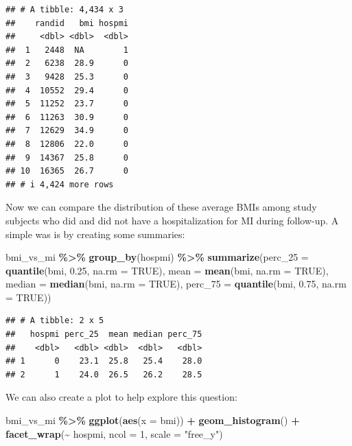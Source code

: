 \documentclass[
]{book}
\newenvironment{Shaded}{\begin{snugshade}}{\end{snugshade}}
\newcommand{\AttributeTok}[1]{\textcolor[rgb]{0.13,0.29,0.53}{#1}}
\newcommand{\ConstantTok}[1]{\textcolor[rgb]{0.56,0.35,0.01}{#1}}
\newcommand{\DecValTok}[1]{\textcolor[rgb]{0.00,0.00,0.81}{#1}}
\newcommand{\FloatTok}[1]{\textcolor[rgb]{0.00,0.00,0.81}{#1}}
\newcommand{\FunctionTok}[1]{\textcolor[rgb]{0.13,0.29,0.53}{\textbf{#1}}}
\newcommand{\NormalTok}[1]{#1}
\newcommand{\SpecialCharTok}[1]{\textcolor[rgb]{0.81,0.36,0.00}{\textbf{#1}}}
\newcommand{\StringTok}[1]{\textcolor[rgb]{0.31,0.60,0.02}{#1}}
\begin{document}
\begin{verbatim}
## # A tibble: 4,434 x 3
##    randid   bmi hospmi
##     <dbl> <dbl>  <dbl>
##  1   2448  NA        1
##  2   6238  28.9      0
##  3   9428  25.3      0
##  4  10552  29.4      0
##  5  11252  23.7      0
##  6  11263  30.9      0
##  7  12629  34.9      0
##  8  12806  22.0      0
##  9  14367  25.8      0
## 10  16365  26.7      0
## # i 4,424 more rows
\end{verbatim}

Now we can compare the distribution of these average BMIs among study subjects who did and did not have a hospitalization for MI during follow-up. A simple was is by creating some summaries:

\begin{Shaded}
\begin{Highlighting}[]
\NormalTok{bmi\_vs\_mi }\SpecialCharTok{\%\textgreater{}\%} 
  \FunctionTok{group\_by}\NormalTok{(hospmi) }\SpecialCharTok{\%\textgreater{}\%} 
  \FunctionTok{summarize}\NormalTok{(}\AttributeTok{perc\_25 =} \FunctionTok{quantile}\NormalTok{(bmi, }\FloatTok{0.25}\NormalTok{, }\AttributeTok{na.rm =} \ConstantTok{TRUE}\NormalTok{), }
            \AttributeTok{mean =} \FunctionTok{mean}\NormalTok{(bmi, }\AttributeTok{na.rm =} \ConstantTok{TRUE}\NormalTok{), }
            \AttributeTok{median =} \FunctionTok{median}\NormalTok{(bmi, }\AttributeTok{na.rm =} \ConstantTok{TRUE}\NormalTok{),}
            \AttributeTok{perc\_75 =} \FunctionTok{quantile}\NormalTok{(bmi, }\FloatTok{0.75}\NormalTok{, }\AttributeTok{na.rm =} \ConstantTok{TRUE}\NormalTok{))}
\end{Highlighting}
\end{Shaded}

\begin{verbatim}
## # A tibble: 2 x 5
##   hospmi perc_25  mean median perc_75
##    <dbl>   <dbl> <dbl>  <dbl>   <dbl>
## 1      0    23.1  25.8   25.4    28.0
## 2      1    24.0  26.5   26.2    28.5
\end{verbatim}

We can also create a plot to help explore this question:

\begin{Shaded}
\begin{Highlighting}[]
\NormalTok{bmi\_vs\_mi }\SpecialCharTok{\%\textgreater{}\%} 
  \FunctionTok{ggplot}\NormalTok{(}\FunctionTok{aes}\NormalTok{(}\AttributeTok{x =}\NormalTok{ bmi)) }\SpecialCharTok{+} 
  \FunctionTok{geom\_histogram}\NormalTok{() }\SpecialCharTok{+} 
  \FunctionTok{facet\_wrap}\NormalTok{(}\SpecialCharTok{\textasciitilde{}}\NormalTok{ hospmi, }\AttributeTok{ncol =} \DecValTok{1}\NormalTok{, }\AttributeTok{scale =} \StringTok{"free\_y"}\NormalTok{)}
\end{Highlighting}
\end{Shaded}
\end{document}
